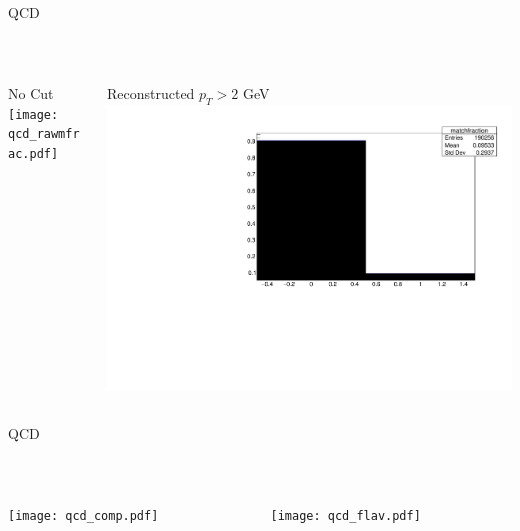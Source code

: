 \documentclass[10pt,handout]{beamer}
\begin{document}
\begin{frame}{ QCD } 

\quad \quad \\
\begin{columns}
\begin{column}{0.5\textwidth}
No Cut
\texttt{[image: qcd\_rawmfrac.pdf]}

\end{column}
\begin{column}{0.5\textwidth}
Reconstructed $p_T > 2 $ GeV
\includegraphics[scale=.3]{qcd_mfrac.pdf}
\end{column}
\end{columns}


\end{frame}


\begin{frame}{ QCD } 

\quad \quad \\
\begin{columns}
\begin{column}{0.5\textwidth}

\texttt{[image: qcd\_comp.pdf]}

\end{column}
\begin{column}{0.5\textwidth}

\texttt{[image: qcd\_flav.pdf]}
\end{column}
\end{columns}
\end{frame}
\end{document}
